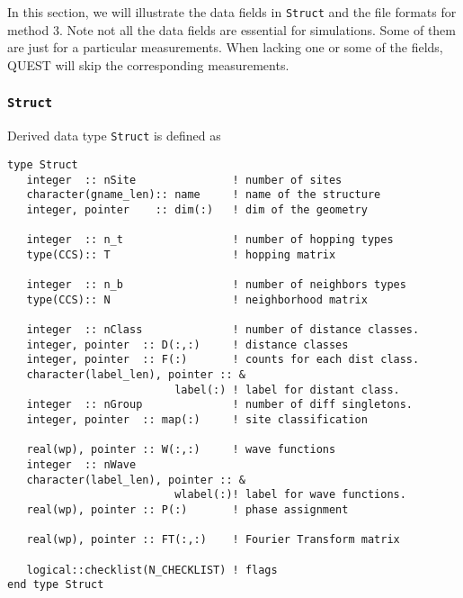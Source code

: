 \documentclass[12pt]{article}
\begin{document}
In this section, we will illustrate the data fields in \verb"Struct" and the file formats for method 3. Note not all the data fields are essential for simulations. Some of them are just for a particular measurements. When lacking one or some of the fields, QUEST will skip the corresponding measurements.

\subsubsection{\tt Struct}
Derived data type \verb"Struct" is defined as
\begin{verbatim}
type Struct
   integer  :: nSite               ! number of sites
   character(gname_len):: name     ! name of the structure
   integer, pointer    :: dim(:)   ! dim of the geometry

   integer  :: n_t                 ! number of hopping types
   type(CCS):: T                   ! hopping matrix

   integer  :: n_b                 ! number of neighbors types
   type(CCS):: N                   ! neighborhood matrix

   integer  :: nClass              ! number of distance classes.
   integer, pointer  :: D(:,:)     ! distance classes
   integer, pointer  :: F(:)       ! counts for each dist class.
   character(label_len), pointer :: &
                          label(:) ! label for distant class.
   integer  :: nGroup              ! number of diff singletons.
   integer, pointer  :: map(:)     ! site classification

   real(wp), pointer :: W(:,:)     ! wave functions
   integer  :: nWave
   character(label_len), pointer :: &
                          wlabel(:)! label for wave functions.
   real(wp), pointer :: P(:)       ! phase assignment

   real(wp), pointer :: FT(:,:)    ! Fourier Transform matrix

   logical::checklist(N_CHECKLIST) ! flags
end type Struct
\end{verbatim}
\end{document}
